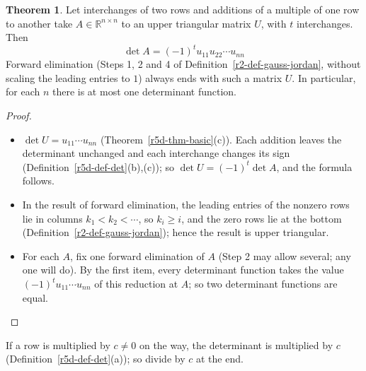\documentclass[12pt]{article}
\newcommand{\R}{\mathbb R}
\theoremstyle{definition}
\newtheorem{theorem}{Theorem}
\begin{document}
\begin{theorem}\label{r5d-thm-gauss}
Let interchanges of two rows and additions of a multiple of one row to another take \(A\in\R^{n\times n}\) to an
upper triangular matrix \(U\), with \(t\) interchanges. Then
\[
\det A=(-1)^tu_{11}u_{22}\cdots u_{nn}
\]
Forward elimination (Steps 1, 2 and 4 of Definition~\ref{r2-def-gauss-jordan}, without scaling the leading
entries to \(1\)) always ends with such a matrix \(U\). In particular, for each \(n\) there is at most one
determinant function.
\end{theorem}
\begin{proof}
\begin{itemize}
\item \(\det U=u_{11}\cdots u_{nn}\) (Theorem~\ref{r5d-thm-basic}(c)). Each addition leaves the determinant
unchanged and each interchange changes its sign (Definition~\ref{r5d-def-det}(b),(c)); so
\(\det U=(-1)^t\det A\), and the formula follows.
\item In the result of forward elimination, the leading entries of the nonzero rows lie in columns
\(k_1<k_2<\cdots\), so \(k_i\geqslant i\), and the zero rows lie at the bottom
(Definition~\ref{r2-def-gauss-jordan}); hence the result is upper triangular.
\item For each \(A\), fix one forward elimination of \(A\) (Step 2 may allow several; any one will do). By the
first item, every determinant function takes the value \((-1)^tu_{11}\cdots u_{nn}\) of this reduction at \(A\); so
two determinant functions are equal.\qedhere
\end{itemize}
\end{proof}
If a row is multiplied by \(c\ne0\) on the way, the determinant is multiplied by \(c\)
(Definition~\ref{r5d-def-det}(a)); so divide by \(c\) at the end.
\end{document}
